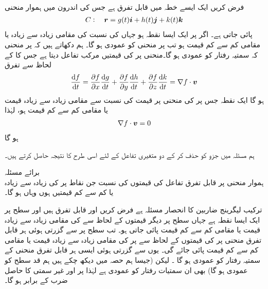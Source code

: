 \\
 فرض کریں    ایک ایسے خطہ میں قابل تفرق ہے جس کی اندرون میں ہموار منحنی
\begin{align*}
C:\quad {\ensuremath{{\boldsymbol{r}}}}=g(t){\boldsymbol{i}}+h(t){\boldsymbol{j}}+k(t){\boldsymbol{k}}
\end{align*}
پائی جاتی ہے۔ اگر  پر  ایک ایسا  نقطہ ہو جہاں  کی نسبت   کی  مقامی زیادہ سے زیادہ یا مقامی کم سے کم قیمت ہو تب  پر  منحنی  کو عمودی ہو گا۔ 
ہم دکھاتے ہیں کہ  پر منحنی کہ سمتیہ رفتار کو  عمودی ہو گا۔منحنی  پر  کی قیمتیں  مرکب تفاعل   دیتا ہے جس کا  کے لحاظ سے تفرق
\begin{align*}
\frac{\dif f}{\dif t}=\frac{\partial f}{\partial x}\frac{\dif g}{\dif t}+\frac{\partial f}{\partial y}\frac{\dif h}{\dif t}+\frac{\partial f}{\partial z}\frac{\dif k}{\dif t}=\nabla f\cdot \kvec{v}
\end{align*}
ہو گا ایک نقطہ  جس پر   کی منحنی پر قیمت کی نسبت سے  مقامی زیادہ سے زیادہ قیمت یا مقامی کم سے کم قیمت ہو،   لہٰذا
\begin{align*}
\nabla f\cdot {\ensuremath{{\boldsymbol{v}}}}=0
\end{align*}
ہو گا

ہم مسئلہ  میں جزو  کو حذف  کر کے دو متغیری  تفاعل  کے لئے اسی طرح کا نتیجہ حاصل کرتے ہیں۔

برائے مسئلہ \\
ہموار منحنی   پر   قابل تفرق تفاعل  کی قیمتوں کی نسبت  جن نقاط پر    کی زیادہ سے زیادہ یا کم سے کم قیمتیں ہوں وہاں  ہو گا۔

ترکیب لیگرینج  ضاربین کا انحصار مسئلہ  ہے فرض کریں  اور  قابل تفرق ہیں اور  سطح  پر  ایک ایسا نقطہ ہے  جہاں  سطح پر دیگر قیمتوں کے لحاظ سے  کی مقامی زیادہ سے زیادہ قیمت یا مقامی کم سے کم قیمت پائی جاتی ہو۔ تب  سطح  پر  سے  گزرتی ہوئی  ہر قابل تفرق منحنی پر   کی قیمتوں کے لحاظ  سے  پر  کی مقامی زیادہ سے زیادہ قیمت یا مقامی کم سے کم قیمت پائی جائے گی۔ یوں  سے گزرتی ہوئی ایسی ہر قابل تفرق  منحنی کے سمتیہ رفتار کو  عمودی ہو گا  ۔ لیکن   (جیسا ہم حصہ  میں دیکھ چکے ہیں   ہم قد سطح  کو عمودی ہو گا) بھی ان سمتیات  رفتار کو عمودی ہے لہٰذا  پر  اور غیر سمتی   کا حاصل ضرب  کے برابر ہو گا۔ 

